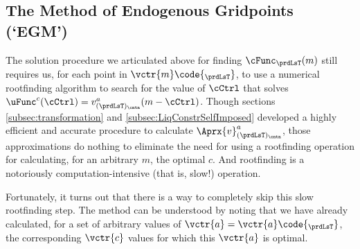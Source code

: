 \documentclass[titlepage, headings=optiontotocandhead]{Resources/texmf-local/tex/latex/econtex}
\begin{document}
\hypertarget{the-method-of-endogenous-gridpoints}{}
\subsection{The Method of Endogenous Gridpoints (`EGM')}\label{subsec:egm}

The solution procedure we articulated above for finding $\cFunc_{\prdLsT}(m)$ still requires us, for each point in $\vctr{m}\code{_{\prdLsT}}$, to use a numerical rootfinding algorithm to search for the value of $\cCtrl$ that solves $\uFunc^{c}(\cCtrl) = v^{a}_{(\prdLsT)_\cntn}(m-\cCtrl)$.  Though sections \ref{subsec:transformation} and \ref{subsec:LiqConstrSelfImposed} developed a highly efficient and accurate procedure to calculate $\Aprx{v}^{a}_{(\prdLsT)_\cntn}$, those approximations do nothing to eliminate the need for using a rootfinding operation for calculating, for an arbitrary $m$, the optimal $c$.  And rootfinding is a notoriously computation-intensive (that is, slow!) operation.

Fortunately, it turns out that there is a way to completely skip this slow rootfinding step.  The method can be understood by noting that we have already calculated, for a set of arbitrary values of $\vctr{a}=\vctr{a}\code{_{\prdLsT}}$, the corresponding $\vctr{c}$ values for which this $\vctr{a}$ is optimal.
\end{document}
